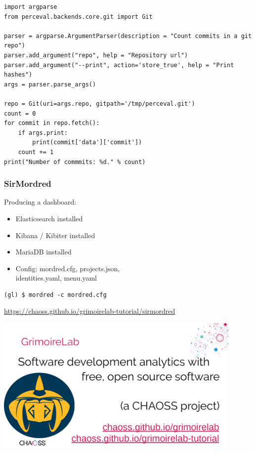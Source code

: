 \documentclass[17pt,aspectratio=169,hyperref=pdfusetitle]{beamer}
\begin{document}
\begin{frame}[fragile]
  
{\footnotesize
\begin{verbatim}
import argparse
from perceval.backends.core.git import Git

parser = argparse.ArgumentParser(description = "Count commits in a git repo")
parser.add_argument("repo", help = "Repository url")
parser.add_argument("--print", action='store_true', help = "Print hashes")
args = parser.parse_args()

repo = Git(uri=args.repo, gitpath='/tmp/perceval.git')
count = 0
for commit in repo.fetch():
    if args.print:
        print(commit['data']['commit'])
    count += 1
print("Number of commmits: %d." % count)
\end{verbatim}
}
\end{frame}


\begin{frame}[fragile]
\frametitle{SirMordred}

Producing a dashboard:

\begin{itemize}
\item Elasticsearch installed
\item Kibana / Kibiter installed
\item MariaDB installed
\item Config: mordred.cfg, projects.json, \\
  identities.yaml, menu.yaml
\end{itemize}

{\small
\begin{verbatim}
(gl) $ mordred -c mordred.cfg
\end{verbatim}
}

{\footnotesize
\begin{flushright}
  \href{chaoss.github.io/grimoirelab-tutorial/sirmordred}{https://chaoss.github.io/grimoirelab-tutorial/sirmordred}
\end{flushright}
}
\end{frame}


\begin{frame}


  \includegraphics[width=12cm]{figs/grimoirelab-slide}

\end{frame}
\end{document}
